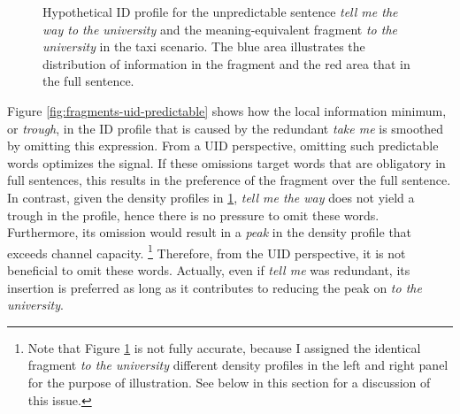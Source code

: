 \begin{figure}[t]
\begin{minipage}{\textwidth}
\end{minipage}
\caption{Hypothetical ID profile for the unpredictable sentence \textit{tell me the way to the university} and the meaning-equivalent fragment \textit{to the university} in the taxi scenario. The blue area illustrates the distribution of information in the fragment and the red area that in the full sentence.\label{fig:fragments-uid-unpredictable}}
\end{figure}
%
Figure \ref{fig:fragments-uid-predictable} shows how the local information minimum, or \textit{trough}, in the ID profile that is caused by the redundant \textit{take me} is smoothed by omitting this expression. From a UID perspective, omitting such predictable words optimizes the signal. If these omissions target words that are obligatory in full sentences, this results in the preference of the fragment over the full sentence. In contrast, given the density profiles in \ref{fig:fragments-uid-unpredictable}, \textit{tell me the way} does not yield a trough in the profile, hence there is no pressure to omit these words. Furthermore, its omission would result in a \textit{peak} in the density profile that exceeds channel capacity.%
%
\footnote{Note that Figure \ref{fig:fragments-uid-unpredictable} is not fully accurate, because I assigned the identical fragment \textit{to the university} different density profiles in the left and right panel for the purpose of illustration. See below in this section for a discussion of this issue.}\afterfn%
%
Therefore, from the UID perspective, it is not beneficial to omit these words. Actually, even if \textit{tell me} was redundant, its insertion is preferred as long as it contributes to reducing the peak on \textit{to the university}. 

